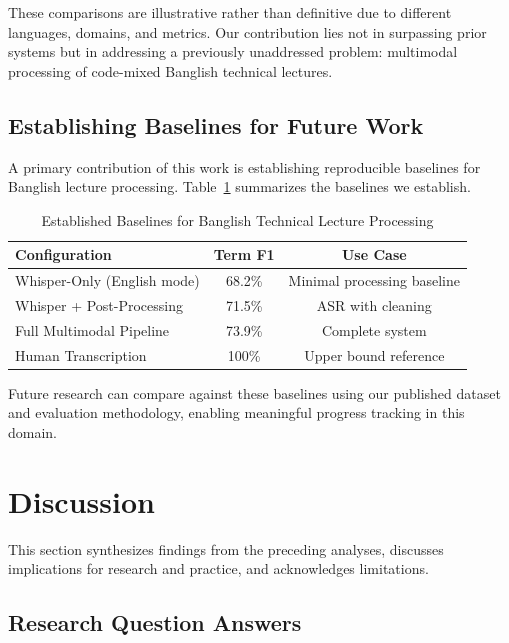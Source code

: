 These comparisons are illustrative rather than definitive due to different languages, domains, and metrics. Our contribution lies not in surpassing prior systems but in addressing a previously unaddressed problem: multimodal processing of code-mixed Banglish technical lectures.

\subsection{Establishing Baselines for Future Work}

A primary contribution of this work is establishing reproducible baselines for Banglish lecture processing. Table~\ref{tab:baselines} summarizes the baselines we establish.

\begin{table}[h]
\centering
\caption{Established Baselines for Banglish Technical Lecture Processing}
\label{tab:baselines}
\begin{tabular}{|l|c|c|}
\hline
\textbf{Configuration} & \textbf{Term F1} & \textbf{Use Case} \\
\hline
Whisper-Only (English mode) & 68.2\% & Minimal processing baseline \\
\hline
Whisper + Post-Processing & 71.5\% & ASR with cleaning \\
\hline
Full Multimodal Pipeline & 73.9\% & Complete system \\
\hline
Human Transcription & 100\% & Upper bound reference \\
\hline
\end{tabular}
\end{table}

Future research can compare against these baselines using our published dataset and evaluation methodology, enabling meaningful progress tracking in this domain.

\section{Discussion}

This section synthesizes findings from the preceding analyses, discusses implications for research and practice, and acknowledges limitations.

\subsection{Research Question Answers}

